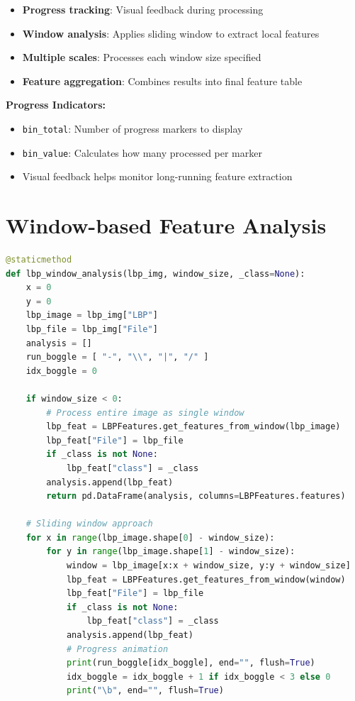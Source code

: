 \documentclass[10pt]{book}
\begin{document}
\begin{itemize}
\item \textbf{Progress tracking}: Visual feedback during processing
\item \textbf{Window analysis}: Applies sliding window to extract local features
\item \textbf{Multiple scales}: Processes each window size specified
\item \textbf{Feature aggregation}: Combines results into final feature table
\end{itemize}

\textbf{Progress Indicators:}
\begin{itemize}
\item \texttt{bin\_total}: Number of progress markers to display
\item \texttt{bin\_value}: Calculates how many processed per marker
\item Visual feedback helps monitor long-running feature extraction
\end{itemize}

\section{Window-based Feature Analysis}

\begin{lstlisting}[language=Python]
@staticmethod
def lbp_window_analysis(lbp_img, window_size, _class=None):
    x = 0
    y = 0
    lbp_image = lbp_img["LBP"]
    lbp_file = lbp_img["File"]
    analysis = []
    run_boggle = [ "-", "\\", "|", "/" ]
    idx_boggle = 0

    if window_size < 0:
        # Process entire image as single window
        lbp_feat = LBPFeatures.get_features_from_window(lbp_image)
        lbp_feat["File"] = lbp_file
        if _class is not None:
            lbp_feat["class"] = _class
        analysis.append(lbp_feat)
        return pd.DataFrame(analysis, columns=LBPFeatures.features)
    
    # Sliding window approach
    for x in range(lbp_image.shape[0] - window_size):
        for y in range(lbp_image.shape[1] - window_size):
            window = lbp_image[x:x + window_size, y:y + window_size]
            lbp_feat = LBPFeatures.get_features_from_window(window)
            lbp_feat["File"] = lbp_file
            if _class is not None:
                lbp_feat["class"] = _class
            analysis.append(lbp_feat)
            # Progress animation
            print(run_boggle[idx_boggle], end="", flush=True)
            idx_boggle = idx_boggle + 1 if idx_boggle < 3 else 0
            print("\b", end="", flush=True)
\end{lstlisting}
\end{document}
